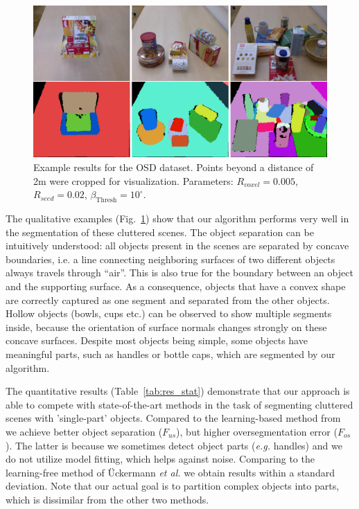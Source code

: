 \begin{figure}[!ht]
 \centering
 \includegraphics[width=1\linewidth]{figures/CVPR2014/osd_examples}
 \caption[OSD Dataset Examples]{ Example results for the OSD dataset. Points beyond a distance of 2m were cropped for visualization. Parameters: $R_{voxel}=0.005$, $R_{seed}=0.02$, $\beta_\text{Thresh}=10^\circ$.  }
 \label{fig:OSD_results}
\end{figure}

The qualitative examples (Fig.~\ref{fig:OSD_results}) show that our algorithm performs very well in the segmentation of these cluttered scenes. The object separation can be intuitively understood: all objects present in the scenes are separated by concave boundaries, i.e. a line connecting neighboring surfaces of two different objects always travels through ``air''. This is also true for the boundary between an object and the supporting surface. As a consequence, objects that have a convex shape are correctly captured as one segment and separated from the other objects. Hollow objects (bowls, cups etc.) can be observed to show multiple segments inside, because the orientation of surface normals changes strongly on these concave surfaces. Despite most objects being simple, some objects have meaningful parts, such as handles or bottle caps, which are segmented by our algorithm.

The quantitative results (Table~\ref{tab:res_stat}) demonstrate that our approach is able to compete with state-of-the-art methods in the task of segmenting cluttered scenes with 'single-part' objects. Compared to the learning-based method from \cite{Richtsfeld:IROS12} we achieve better object separation ($F_{us}$), but higher oversegmentation error ($F_{os}$). The latter is because we sometimes detect object parts (\textit{e.g.} handles) and we do not utilize model fitting, which helps against noise. Comparing to the learning-free method of \"Uckermann \textit{et al.} \cite{Ritter2012} we obtain results within a standard deviation. Note that our actual goal is to partition complex objects into parts, which is dissimilar from the other two methods.

